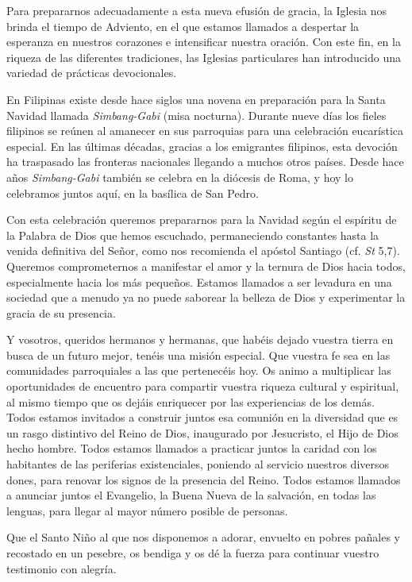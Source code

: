 Para prepararnos adecuadamente a esta nueva efusión de gracia, la Iglesia nos brinda el tiempo de Adviento, en el que estamos llamados a despertar la esperanza en nuestros corazones e intensificar nuestra oración. Con este fin, en la riqueza de las diferentes tradiciones, las Iglesias particulares han introducido una variedad de prácticas devocionales.

En Filipinas existe desde hace siglos una novena en preparación para la Santa Navidad llamada \emph{Simbang-Gabi} (misa nocturna). Durante nueve días los fieles filipinos se reúnen al amanecer en sus parroquias para una celebración eucarística especial. En las últimas décadas, gracias a los emigrantes filipinos, esta devoción ha traspasado las fronteras nacionales llegando a muchos otros países. Desde hace años \emph{Simbang-Gabi} también se celebra en la diócesis de Roma, y hoy lo celebramos juntos aquí, en la basílica de San Pedro.

Con esta celebración queremos prepararnos para la Navidad según el espíritu de la Palabra de Dios que hemos escuchado, permaneciendo constantes hasta la venida definitiva del Señor, como nos recomienda el apóstol Santiago (cf. \emph{St} 5,7). Queremos comprometernos a manifestar el amor y la ternura de Dios hacia todos, especialmente hacia los más pequeños. Estamos llamados a ser levadura en una sociedad que a menudo ya no puede saborear la belleza de Dios y experimentar la gracia de su presencia.

Y vosotros, queridos hermanos y hermanas, que habéis dejado vuestra tierra en busca de un futuro mejor, tenéis una misión especial. Que vuestra fe sea  en las comunidades parroquiales a las que pertenecéis hoy. Os animo a multiplicar las oportunidades de encuentro para compartir vuestra riqueza cultural y espiritual, al mismo tiempo que os dejáis enriquecer por las experiencias de los demás. Todos estamos invitados a construir juntos esa comunión en la diversidad que es un rasgo distintivo del Reino de Dios, inaugurado por Jesucristo, el Hijo de Dios hecho hombre. Todos estamos llamados a practicar juntos la caridad con los habitantes de las periferias existenciales, poniendo al servicio nuestros diversos dones, para renovar los signos de la presencia del Reino. Todos estamos llamados a anunciar juntos el Evangelio, la Buena Nueva de la salvación, en todas las lenguas, para llegar al mayor número posible de personas.

Que el Santo Niño al que nos disponemos a adorar, envuelto en pobres pañales y recostado en un pesebre, os bendiga y os dé la fuerza para continuar vuestro testimonio con alegría.

